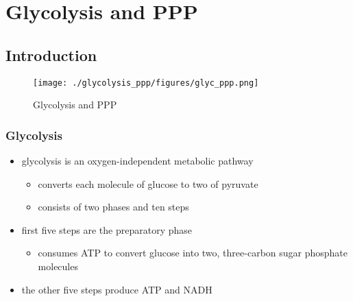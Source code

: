 \documentclass{scrartcl}
\begin{document}
\section{Glycolysis and PPP}
\label{sec:org74ab68e}
\subsection{Introduction}
\label{sec:orgfdb14b8}
\begin{figure}[htbp]
\centering
\texttt{[image: ./glycolysis\_ppp/figures/glyc\_ppp.png]}
\caption{\label{fig:org3828722}
Glycolysis and PPP}
\end{figure}

\subsubsection{Glycolysis}
\label{sec:org0509e32}
\begin{itemize}
\item glycolysis is an oxygen-independent metabolic pathway
\begin{itemize}
\item converts each molecule of glucose to two of pyruvate
\item consists of two phases and ten steps
\end{itemize}
\item first five steps are the preparatory phase
\begin{itemize}
\item consumes ATP to convert glucose into two, three-carbon sugar
phosphate molecules
\end{itemize}
\item the other five steps produce ATP and NADH
\end{itemize}
\end{document}

